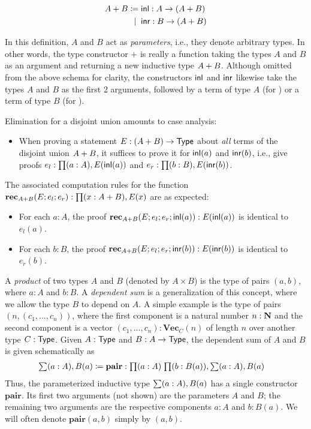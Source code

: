 \begin{align*}
  A + B \coloneqq \; & \mathsf{inl} : A \to (A + B) \\
         \;|\;\; & \mathsf{inr} : B \to (A + B)
\end{align*}

In this definition, $A$ and $B$ act as \emph{parameters}, i.e., they denote arbitrary types. In other words, the type constructor $+$ is really a function taking the types $A$ and $B$ as an argument and returning a new inductive type $A + B$. Although omitted from the above schema for clarity, the constructors $\mathsf{inl}$ and $\mathsf{inr}$ likewise take the types $A$ and $B$ as the first 2 arguments, followed by a term of type $A$ (for \inl) or a term of type $B$ (for \inr).

Elimination for a disjoint union amounts to case analysis:
\begin{itemize}
\item When proving a statement $E : (A + B) \to \mathsf{Type}$ about \emph{all} terms of the disjoint union $A + B$, it suffices to prove it for $\mathsf{inl}(a)$ and $\mathsf{inr}(b)$, i.e., give proofs $e_l : \prd{a:A} E(\inl(a))$ and $e_r : \prd{b:B} E(\inr(b))$.
\end{itemize}
The associated computation rules for the function $\rec_{\disj{A}{B}}(E;e_l;e_r) : \prd{x:\disj{A}{B}} E(x)$ are as expected:
\begin{itemize}
\item For each $a : A$, the proof $\mathbf{rec}_{A + B}(E;e_l;e_r;\mathsf{inl}(a)) : E(\mathsf{inl}(a))$ is identical to $e_l(a)$.
\item For each $b : B$, the proof $\mathbf{rec}_{A + B}(E;e_l;e_r;\mathsf{inr}(b)) : E(\mathsf{inr}(b))$ is identical to $e_r(b)$.
\end{itemize}

A \emph{product} of two types $A$ and $B$ (denoted by $A \times B$) is the type of pairs $(a,b)$, where $a : A$ and $b : B$. A \emph{dependent sum} is a generalization of this concept, where we allow the type $B$ to depend on $A$. A simple example is the type of pairs $(n,(c_1,\ldots,c_n))$, where the first component is a natural number $n : \mathbf{N}$ and the second component is a vector $(c_1,\ldots,c_n) : \mathbf{Vec}_C(n)$ of length $n$ over another type $C : \mathsf{Type}$.
Given $A : \mathsf{Type}$ and $B : A \to \mathsf{Type}$, the dependent sum of $A$ and $B$ is given schematically as
\begin{align*}
  \sm{a:A} B(a) \defeq \; & \mathbf{pair} : \prd{a:A}{b:B(a)} \sm{a:A} B(a)
\end{align*}
Thus, the parameterized inductive type $\sm{a:A} B(a)$ has a single constructor $\mathbf{pair}$. Its first two arguments (not shown) are the parameters $A$ and $B$; the remaining two arguments are the respective components $a : A$ and $b : B(a)$. We will often denote $\mathbf{pair}(a,b)$ simply by $(a,b)$.


